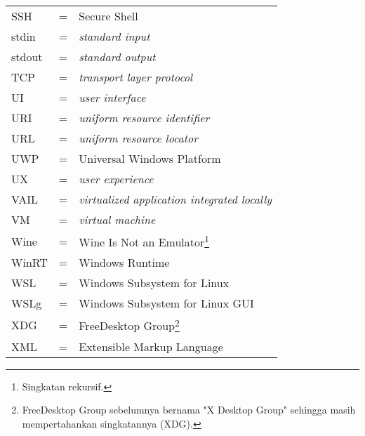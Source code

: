 \begin{longtable}{llp{3in}}
    SSH & \hspace{1.5cm} = & Secure Shell\\
    stdin & \hspace{1.5cm} = & \textit{standard input}\\
    stdout & \hspace{1.5cm} = & \textit{standard output}\\
    TCP & \hspace{1.5cm} = & \textit{transport layer protocol}\\
    UI & \hspace{1.5cm} = & \textit{user interface}\\
    URI & \hspace{1.5cm} = & \textit{uniform resource identifier}\\
    URL & \hspace{1.5cm} = & \textit{uniform resource locator}\\
    UWP & \hspace{1.5cm} = & Universal Windows Platform\\
    UX & \hspace{1.5cm} = & \textit{user experience}\\
    VAIL & \hspace{1.5cm} = & \textit{virtualized application integrated locally}\\
    VM & \hspace{1.5cm} = & \textit{virtual machine}\\
    Wine & \hspace{1.5cm} = & Wine Is Not an Emulator\footnote{Singkatan rekursif.}\\
    WinRT & \hspace{1.5cm} = & Windows Runtime\\
    WSL & \hspace{1.5cm} = & Windows Subsystem for Linux\\
    WSLg & \hspace{1.5cm} = & Windows Subsystem for Linux GUI\\
    XDG & \hspace{1.5cm} = & FreeDesktop Group\footnote{FreeDesktop Group sebelumnya bernama "X Desktop Group" sehingga masih mempertahankan singkatannya (XDG).}\\
    XML & \hspace{1.5cm} = & Extensible Markup Language
\end{longtable}
